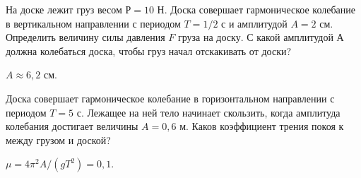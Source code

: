 \begin{ex} %
На доске лежит груз весом $Р = 10$ Н. Доска совершает гармоническое колебание в вертикальном направлении с периодом $T = 1/2$ с и амплитудой $A = 2$ см. Определить величину силы давления $F$ груза на доску. С какой амплитудой А должна колебаться доска, чтобы груз начал отскакивать от доски?
\begin{ans}
$A \approx 6,2$ см.
\end{ans}
\end{ex}	

\begin{ex} %
Доска совершает гармоническое колебание в горизонтальном направлении с периодом $T = 5$ с. Лежащее на ней тело начинает скользить, когда амплитуда колебания достигает величины $A = 0,6$ м. Каков коэффициент трения покоя к между грузом и доской?
\begin{ans}
$\mu = 4 \pi^2 A / (gT^2) = 0,1$.
\end{ans}
\end{ex}	

\clearpage